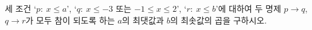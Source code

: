세 조건 `$p:\ x\le a$', `$q:\ x\le -3$ 또는 $-1\le x\le 2$', `$r:\ x\le b$'에 대하여 두 명제 $p\longrightarrow q$, $q\longrightarrow r$가 모두 참이 되도록 하는 $a$의 최댓값과 $b$의 최솟값의 곱을 구하시오. 
